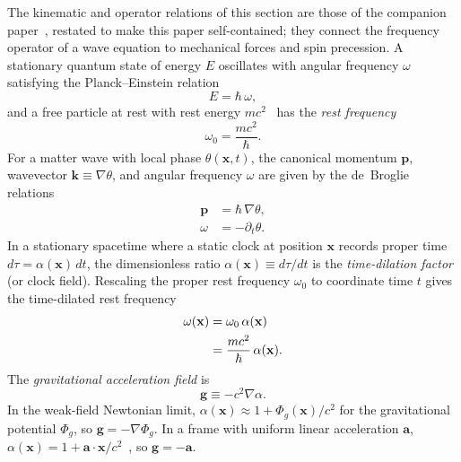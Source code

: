 \documentclass[aps,prd,onecolumn,tightenlines,nofootinbib,notitlepage,11pt,floatfix]{revtex4-2}
\theoremstyle{indentedtheorem}
\begin{document}
The kinematic and operator relations of this section are those of the companion paper~\citep{HutchisonSGM2026}, restated to make this paper self-contained; they connect the frequency operator of a wave equation to mechanical forces and spin precession. A stationary quantum state of energy $E$ oscillates with angular frequency $\omega$ satisfying the Planck--Einstein relation~\citep{Planck1901Radiation,Einstein1905Photoelectric}
\begin{equation}
    E = \hbar \, \omega ,
    \label{eq:planck}
\end{equation}
and a free particle at rest with rest energy $mc^2$~\citep{Einstein1905Inertia} has the \emph{rest frequency}
\begin{equation}
    \omega_0 = \frac{mc^2}{\hbar} .
    \label{eq:rest_freq}
\end{equation}
For a matter wave with local phase $\theta(\mathbf{x},t)$, the canonical momentum $\mathbf{p}$, wavevector $\mathbf{k}\equiv\nabla\theta$, and angular frequency $\omega$ are given by the de~Broglie relations~\citep{deBroglie1925Thesis}
\begin{align}
    \mathbf{p} &= \hbar\,\nabla\theta , \nonumber \\
    \omega &= -\partial_t\theta .
    \label{eq:debroglie}
\end{align}
In a stationary spacetime where a static clock at position $\mathbf{x}$ records proper time $d\tau = \alpha(\mathbf{x})\,dt$, the dimensionless ratio $\alpha(\mathbf{x}) \equiv d\tau/dt$ is the \emph{time-dilation factor} (or clock field). Rescaling the proper rest frequency $\omega_0$ to coordinate time $t$ gives the time-dilated rest frequency
\begin{align}
    \omega(\mathbf{x}) &= \omega_0\,\alpha(\mathbf{x}) \notag\\
    &= \frac{mc^2}{\hbar}\,\alpha(\mathbf{x}) .
    \label{eq:omega_alpha}
\end{align}
The \emph{gravitational acceleration field} is
\begin{equation}
    \mathbf{g} \equiv -c^2\nabla\alpha .
    \label{eq:g_grad_alpha}
\end{equation}
In the weak-field Newtonian limit, $\alpha(\mathbf{x}) \approx 1 + \Phi_g(\mathbf{x})/c^2$ for the gravitational potential $\Phi_g$, so $\mathbf{g} = -\nabla\Phi_g$. In a frame with uniform linear acceleration $\mathbf{a}$, $\alpha(\mathbf{x}) = 1 + \mathbf{a}\cdot\mathbf{x}/c^2$~\citep{Einstein1907Relativitatsprinzip,HehlNi1990Inertial}, so $\mathbf{g} = -\mathbf{a}$.
\end{document}

